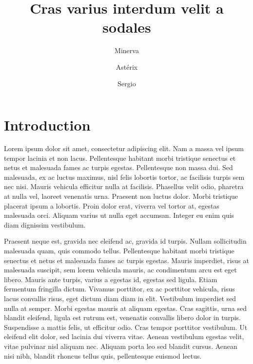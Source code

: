 \documentclass[]{scrartcl}
\title{Cras varius interdum velit a sodales}
\author[1,2]{Minerva}
\author[1]{Astérix}
\author[2]{Sergio}
\affil[1]{Univ. Orléans, CNRS, BRGM, ISTO, UMR 7327, F-45071, Orléans, France}
\affil[2]{GeoRessources (UMR 7359, Universit\'e de Lorraine / CNRS / CREGU), Vandoeuvre-l\`es-Nancy, F-54518 France}
\begin{document}
%
%

\maketitle	
\section*{Introduction}

	Lorem ipsum dolor sit amet, consectetur adipiscing elit. Nam a massa vel ipsum tempor lacinia et non lacus. Pellentesque habitant morbi tristique senectus et netus et malesuada fames ac turpis egestas. Pellentesque non massa dui. Sed malesuada, ex ac luctus maximus, nisl felis lobortis tortor, ac facilisis turpis sem nec nisi. Mauris vehicula efficitur nulla at facilisis. Phasellus velit odio, pharetra at nulla vel, laoreet venenatis urna. Praesent non luctus dolor. Morbi tristique placerat ipsum a lobortis. Proin dolor erat, viverra vel tortor at, egestas malesuada orci. Aliquam varius ut nulla eget accumsan. Integer eu enim quis diam dignissim vestibulum.
	
	Praesent neque est, gravida nec eleifend ac, gravida id turpis. Nullam sollicitudin malesuada quam, quis commodo tellus. Pellentesque habitant morbi tristique senectus et netus et malesuada fames ac turpis egestas. Mauris imperdiet, risus at malesuada suscipit, sem lorem vehicula mauris, ac condimentum arcu est eget libero. Mauris ante turpis, varius a egestas id, egestas sed ligula. Etiam fermentum fringilla dictum. Vivamus porttitor, ex ac porttitor vehicula, risus lacus convallis risus, eget dictum diam diam in elit. Vestibulum imperdiet sed nulla at semper. Morbi egestas mauris at aliquam egestas. Cras sagittis, urna sed blandit eleifend, ligula est rutrum est, venenatis convallis libero dolor in turpis. Suspendisse a mattis felis, ut efficitur odio. Cras tempor porttitor vestibulum. Ut eleifend elit dolor, sed lacinia dui viverra vitae. Aenean vestibulum egestas velit, vitae pulvinar nisl aliquam nec. Aliquam porta leo sed blandit cursus. Aenean nisi nibh, blandit rhoncus tellus quis, pellentesque euismod lectus.
	
\end{document}
